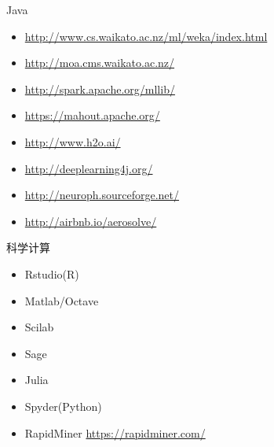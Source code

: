 \documentclass[presentation]{beamer}
\begin{document}
\begin{frame}[label={sec:org3ed9c69}]{Java}
\begin{itemize}
\item \url{http://www.cs.waikato.ac.nz/ml/weka/index.html}
\item \url{http://moa.cms.waikato.ac.nz/}
\item \url{http://spark.apache.org/mllib/}
\item \url{https://mahout.apache.org/}
\item \url{http://www.h2o.ai/}
\item \url{http://deeplearning4j.org/}
\item \url{http://neuroph.sourceforge.net/}
\item \url{http://airbnb.io/aerosolve/}
\end{itemize}
\end{frame}

\begin{frame}[label={sec:org8b2adc1}]{科学计算}
\begin{itemize}
\item Rstudio(R)
\item Matlab/Octave
\item Scilab
\item Sage
\item Julia
\item Spyder(Python)
\item RapidMiner \url{https://rapidminer.com/}
\end{itemize}
\end{frame}
\end{document}
